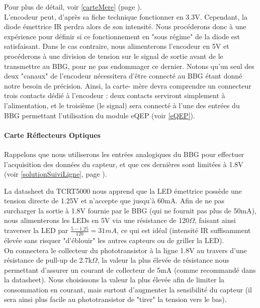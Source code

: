 			Pour plus de détail, voir \ref{carteMere} (page \pageref{carteMere}).\\

			L'encodeur peut, d'après sa fiche technique \cite{bib9} fonctionner en 3.3V. Cependant, la diode émettrice IR perdra alors de son intensité. Nous procéderons donc à une expérience pour définir si ce fonctionnement en "sous régime" de la diode est satisfaisant. Dans le cas contraire, nous alimenterons l'encodeur en 5V et procéderons à une division de tension sur le signal de sortie avant de le transmettre au BBG, pour ne pas endommager ce dernier. Notons qu'un seul des deux "canaux" de l'encodeur nécessitera d'être connecté au BBG étant donné notre besoin de précision. Ainsi, la carte- mère devra comprendre un connecteur trois contacts dédié à l'encodeur : deux contacts serviront simplement à l'alimentation, et le troisième (le signal) sera connecté à l'une des entrées du BBG permettant l'utilisation du module eQEP (voir \ref{eQEP}).

		\paragraph{Carte Réflecteurs Optiques}\label{integrationReflecteurs}

			Rappelons que nous utiliserons les entrées analogiques du BBG pour effectuer l'acquisition des données du capteur, et que ces dernières sont limitées à 1.8V (voir \ref{solutionSuiviLigne}, page \pageref{solutionSuiviLigne}).

			La datasheet du TCRT5000 \cite{bib7} nous apprend que la LED émettrice possède une tension directe de 1.25V et n'accepte que jusqu'à 60mA.
			Afin de ne pas surcharger la sortie à 1.8V fournie par le BBG (qui ne fournit pas plus de 50mA), nous alimenterons les LEDs en 5V via une résistance de 120$\Omega$, faisant ainsi traverser la LED par $\frac{5-1.25}{120}=31mA$, ce qui est idéal (intensité IR suffisamment élevée sans risquer "d'éblouir" les autres capteurs ou de griller la LED).\\

			On connectera le collecteur du phototransistor à la ligne 1.8V au travers d'une résistance de pull-up de 2.7k$\Omega$, la valeur la plus élevée de résistance nous permettant d'assurer un courant de collecteur de 5mA (comme recommandé dans la datasheet). Nous choisissons la valeur la plus élevée afin de limiter la consommation en courant, mais surtout d'augmenter la sensibilité du capteur (il sera ainsi plus facile au phototransistor de "tirer" la tension vers le bas).\\


